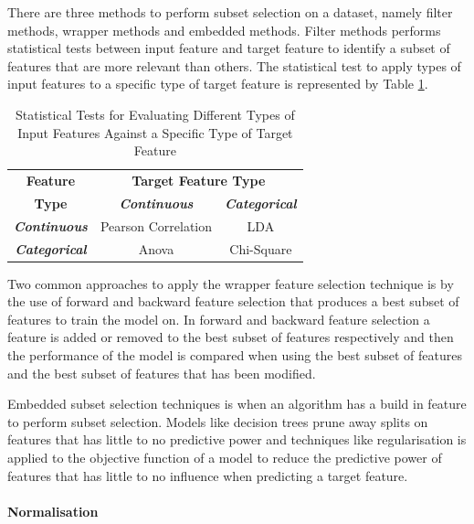 \documentclass[10pt, conference]{IEEEtran}
\begin{document}
There are three methods to perform subset selection on a dataset, namely filter methods, wrapper methods and
embedded methods. Filter methods performs statistical tests between input feature and target feature to
identify a subset of features that are more relevant than others. The statistical test to apply types
of input features to a specific type of target feature is represented by Table \ref{tab:feature_selection_table}.
\begin{table}[h!]
    \caption{Statistical Tests for Evaluating Different Types of Input Features Against a Specific Type of Target Feature}
    \begin{center}
        \begin{tabular}{|c||c|c|}
            \hline
            \textbf{Feature}&\multicolumn{2}{|c|}{\textbf{Target Feature Type}} \\
            \cline{2-3} 
            \textbf{Type} & \textbf{\textit{Continuous}}& \textbf{\textit{Categorical}} \\
            \hline
            \textbf{\textit{Continuous}}& Pearson Correlation& LDA\\
            \hline
            \textbf{\textit{Categorical}}& Anova & Chi-Square\\
            \hline
        \end{tabular}
        \label{tab:feature_selection_table}
    \end{center}
\end{table}

Two common approaches to apply the wrapper feature selection technique is by the use of forward and backward
feature selection that produces a best subset of features to train the model on. In forward and backward feature
selection a feature is added or removed to the best subset of features respectively and then the performance
of the model is compared when using the best subset of features and the best subset of features that has been
modified.

Embedded subset selection techniques is when an algorithm has a build in feature to perform subset selection.
Models like decision trees prune away splits on features that has little to no predictive power and techniques
like regularisation is applied to the objective function of a model to reduce the predictive
power of features that has little to no influence when predicting a target feature.

\paragraph{Normalisation}
\end{document}
